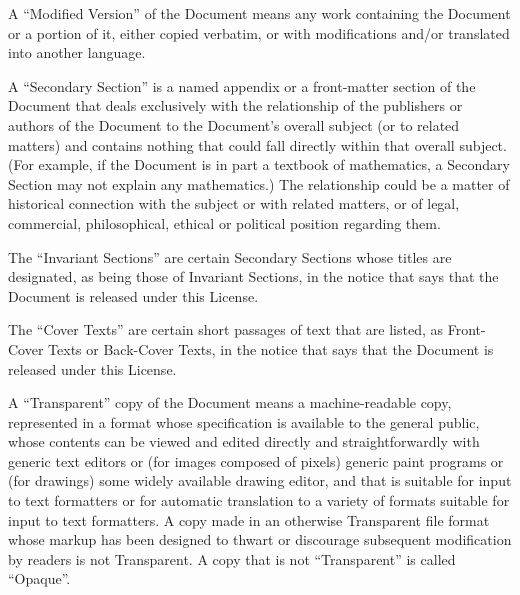       A ``Modified Version'' of the Document means any work
      containing the Document or a portion of it, either copied
      verbatim, or with modifications and/or translated into another
      language.
    

	
    

      A ``Secondary Section'' is a named appendix or a
      front-matter section of the Document that deals exclusively
      with the relationship of the publishers or authors of the
      Document to the Document's overall subject (or to related
      matters) and contains nothing that could fall directly within
      that overall subject. (For example, if the Document is in part a
      textbook of mathematics, a Secondary Section may not explain any
      mathematics.)  The relationship could be a matter of historical
      connection with the subject or with related matters, or of
      legal, commercial, philosophical, ethical or political position
      regarding them.
    

    

      The ``Invariant Sections'' are certain  Secondary Sections whose titles
      are designated, as being those of Invariant Sections, in the
      notice that says that the Document is released under this
      License.
    

    
    

      The ``Cover Texts'' are certain short passages of
      text that are listed, as Front-Cover Texts or Back-Cover Texts,
      in the notice that says that the Document is released under this
      License.
    

	
    

      A ``Transparent'' copy of the  Document means a machine-readable
      copy, represented in a format whose specification is available
      to the general public, whose contents can be viewed and edited
      directly and straightforwardly with generic text editors or (for
      images composed of pixels) generic paint programs or (for
      drawings) some widely available drawing editor, and that is
      suitable for input to text formatters or for automatic
      translation to a variety of formats suitable for input to text
      formatters. A copy made in an otherwise Transparent file format
      whose markup has been designed to thwart or discourage
      subsequent modification by readers is not Transparent.  A copy
      that is not ``Transparent'' is called
      ``Opaque''.
    

